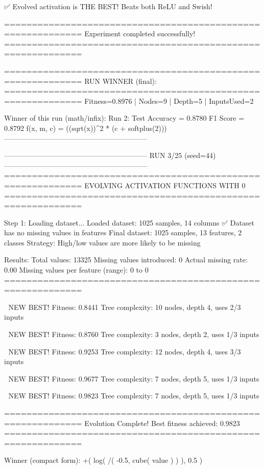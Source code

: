 ✅ Evolved activation is THE BEST! Beats both ReLU and Swish!

============================================================
Experiment completed successfully!
============================================================

============================================================
RUN WINNER (final):
============================================================
Fitness=0.8976 | Nodes=9 | Depth=5 | InputsUsed=2

Winner of this run (math/infix):
  Run 2:
     Test Accuracy = 0.8780
     F1 Score      = 0.8792
     f(x, m, c)    = ((sqrt(x))^2 * (c + softplus(2)))
------------------------------------------------------------

------------------------------------------------------------
RUN 3/25 (seed=44)
------------------------------------------------------------
============================================================
EVOLVING ACTIVATION FUNCTIONS
WITH 0%
============================================================

Step 1: Loading dataset...
Loaded dataset: 1025 samples, 14 columns
✅ Dataset has no missing values in features
Final dataset: 1025 samples, 13 features, 2 classes
Strategy: High/low values are more likely to be missing

Results:
  Total values: 13325
  Missing values introduced: 0
  Actual missing rate: 0.00%
  Missing values per feature (range): 0 to 0
============================================================


🎯 NEW BEST! Fitness: 0.8441
Tree complexity: 10 nodes, depth 4, uses 2/3 inputs

🎯 NEW BEST! Fitness: 0.8760
Tree complexity: 3 nodes, depth 2, uses 1/3 inputs

🎯 NEW BEST! Fitness: 0.9253
Tree complexity: 12 nodes, depth 4, uses 3/3 inputs

🎯 NEW BEST! Fitness: 0.9677
Tree complexity: 7 nodes, depth 5, uses 1/3 inputs

🎯 NEW BEST! Fitness: 0.9823
Tree complexity: 7 nodes, depth 5, uses 1/3 inputs

============================================================
Evolution Complete!
Best fitness achieved: 0.9823
============================================================

Winner (compact form):
 +(
  log(
    /(
      -0.5,
      cube(
        value
      )
    )
  ),
  0.5
)

